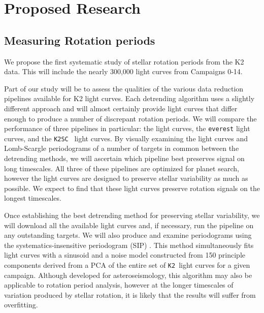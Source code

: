 \documentclass[12pt]{article}
\newcommand{\racomment}[1]{{\color{red}#1}}
\newcommand{\ktwosc}{{\tt K2SC}}
\newcommand{\ktwo}{{\tt K2}}
\begin{document}





\section{Proposed Research}
\subsection{Measuring Rotation periods}
We propose the first systematic study of stellar rotation periods from the K2
data. This will include the nearly 300,000 light curves from Campaigns 0-14.

Part of our study will be to assess the qualities of the various data
reduction pipelines available for K2 light curves.
Each detrending algorithm uses a slightly different approach and will almost
certainly provide light curves that differ enough to produce a number of
discrepant rotation periods.
We will compare the performance of three pipelines in particular: the
\citet{Vanderburg2015} light curves, the {\tt everest} \citet{luger2016} light
curves, and the \ktwosc\ \citet{aigrain2016} light curves.
By visually examining the light curves and Lomb-Scargle periodograms of a
number of targets in common between the detrending methods, we will ascertain
which pipeline best preserves signal on long timescales.
All three of these pipelines are optimized for planet search, however the
\citet{aigrain2016} light curves are designed to preserve stellar variability
as much as possible.
We expect to find that these light curves preserve rotation signals on the
longest timescales.


Once establishing the best detrending method for preserving stellar
variability, we will download all the available light curves and, if
necessary, run the pipeline on any outstanding targets.
We will also produce and examine periodograms using the
systematics-insensitive periodogram (SIP) \citep{angus2015}.
This method simultaneously fits light curves with a sinusoid and a noise
model constructed from 150 principle components derived from a PCA of the
entire set of \ktwo\ light curves for a given campaign.
Although developed for asteroseismology, this algorithm may also be applicable
to rotation period analysis, however at the longer timescales of variation
produced by stellar rotation, it is likely that the results will suffer
from overfitting.
\end{document}
